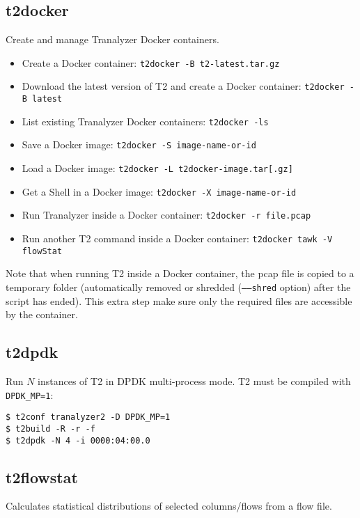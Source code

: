 \documentclass[documentation]{subfiles}
\begin{document}
\subsection{t2docker}\label{t2docker}
Create and manage Tranalyzer Docker containers.
\begin{itemize}
    \item Create a Docker container: {\tt t2docker -B t2-latest.tar.gz}
    \item Download the latest version of T2 and create a Docker container: {\tt t2docker -B latest}
    \item List existing Tranalyzer Docker containers: {\tt t2docker -ls}
    \item Save a Docker image: {\tt t2docker -S image-name-or-id}
    \item Load a Docker image: {\tt t2docker -L t2docker-image.tar[.gz]}
    \item Get a Shell in a Docker image: {\tt t2docker -X image-name-or-id}
    \item Run Tranalyzer inside a Docker container: {\tt t2docker -r file.pcap}
    \item Run another T2 command inside a Docker container: {\tt t2docker tawk -V flowStat}
\end{itemize}

Note that when running T2 inside a Docker container, the pcap file is copied to a temporary folder (automatically removed or shredded ({\tt --{}--shred} option) after the script has ended). This extra step make sure only the required files are accessible by the container.

\subsection{t2dpdk}\label{t2dpdk}
Run $N$ instances of T2 in DPDK multi-process mode.
T2 must be compiled with {\tt DPDK\_MP=1}:

\begin{flushleft}
    {\tt \$ t2conf tranalyzer2 -D DPDK\_MP=1}\\
    {\tt \$ t2build -R -r -f}\\
    {\tt \$ t2dpdk -N 4 -i 0000:04:00.0}
\end{flushleft}

\subsection{t2flowstat}\label{t2flowstat}
Calculates statistical distributions of selected columns/flows from a flow file.
\end{document}
